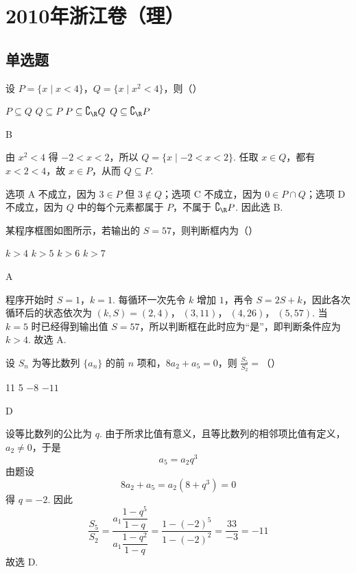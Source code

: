\chapter{2010年浙江卷（理）}

\section{单选题}

\begin{problem}
设 \(P = \{x \mid x < 4\}\)，\(Q = \{x \mid x^2 < 4\}\)，则（\quad）

\choices
    {\(P \subseteq Q\)}
    {\(Q \subseteq P\)}
    {\(P \subseteq \complement_{\R} Q\)}
    {\(Q \subseteq \complement_{\R} P\)}
\begin{answer}
B
\end{answer}

\begin{solution}
由 \(x^2<4\) 得 \(-2<x<2\)，所以 \(Q=\{x\mid -2<x<2\}\). 任取 \(x\in Q\)，都有 \(x<2<4\)，故 \(x\in P\)，从而 \(Q\subseteq P\).

选项 A 不成立，因为 \(3\in P\) 但 \(3\notin Q\)；选项 C 不成立，因为 \(0\in P\cap Q\)；选项 D 不成立，因为 \(Q\) 中的每个元素都属于 \(P\)，不属于 \(\complement_{\R}P\). 因此选 B.
\end{solution}
\end{problem}

\begin{problem}
某程序框图如图所示，若输出的 \(S = 57\)，则判断框内为（\quad）


\choices
    {\(k > 4\)}
    {\(k > 5\)}
    {\(k > 6\)}
    {\(k > 7\)}
\begin{answer}
A
\end{answer}

\begin{solution}
程序开始时 \(S=1\)，\(k=1\). 每循环一次先令 \(k\) 增加 \(1\)，再令 \(S=2S+k\)，因此各次循环后的状态依次为
\((k,S)=(2,4)\)，\(\ (3,11)\)，\(\ (4,26)\)，\(\ (5,57)\).
当 \(k=5\) 时已经得到输出值 \(S=57\)，所以判断框在此时应为“是”，即判断条件应为 \(k>4\). 故选 A.
\end{solution}
\end{problem}

\begin{problem}
设 \(S_{n}\) 为等比数列 \(\{a_{n}\}\) 的前 \(n\) 项和，\(8a_{2} + a_{5} = 0\)，则 \(\frac{S_{5}}{S_{2}} =\)（\quad）

\choices
    {11}
    {5}
    {\(-8\)}
    {\(-11\)}
\begin{answer}
D
\end{answer}

\begin{solution}
设等比数列的公比为 \(q\). 由于所求比值有意义，且等比数列的相邻项比值有定义，\(a_2\ne0\)，于是
\[
a_5=a_2q^3
\]
由题设
\[
8a_2+a_5=a_2(8+q^3)=0
\]
得 \(q=-2\). 因此
\[
\frac{S_5}{S_2}
=\frac{a_1\dfrac{1-q^5}{1-q}}{a_1\dfrac{1-q^2}{1-q}}
=\frac{1-(-2)^5}{1-(-2)^2}
=\frac{33}{-3}=-11
\]
故选 D.
\end{solution}
\end{problem}


